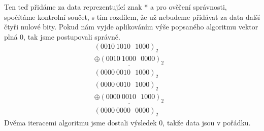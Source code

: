 Ten teď přidáme za data reprezentující znak * a pro ověření správnosti, spočítáme kontrolní součet, s tím rozdílem, že už nebudeme přidávat za data další čtyři nulové bity. Pokud nám vyjde aplikováním výše popsaného algoritmu vektor plná 0, tak jsme postupovali správně.
\begin{eqnarray}
    (0010~1010~~~1000)_2  & \nonumber\\\underline{\oplus
    (0010~1000~~~0000)_2} & \nonumber\\
    (0000~0010~~~1000)_2  & \nonumber
\end{eqnarray}
\begin{eqnarray}
    (0000~0010~~~1000)_2  & \nonumber\\\underline{\oplus
    (0000~0010~~~1000)_2} & \nonumber\\
    (0000~0000~~~0000)_2  & \nonumber
\end{eqnarray}
Dvěma iteracemi algoritmu jsme dostali výsledek 0, takže data jsou v pořádku.

